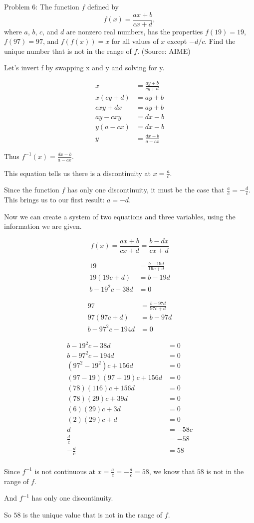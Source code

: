 Problem 6: The function $f$ defined by $$f(x) = \frac{ax + b}{cx + d}, $$where $a$, $b$, $c$, and $d$ are nonzero real numbers, has the properties $f(19) = 19$, $f(97) = 97$, and $f(f(x)) = x$ for all values of $x$ except $-d/c$. Find the unique number that is not in the range of $f$. (Source: AIME)

Let's invert f by swapping x and y and solving for y.

\begin{align*}
x &= \frac{ay + b}{cy + d} \\
x(cy + d) &= ay + b \\
cxy + dx &= ay + b \\
ay - cxy &= dx - b \\
y(a - cx) &= dx - b \\
y &= \frac{dx - b}{a - cx}
\end{align*}

Thus $f^{-1}(x) = \frac{dx - b}{a - cx}$.

This equation tells us there is a discontinuity at $x = \frac{a}{c}$.

Since the function $f$ has only one discontinuity, it must be the case that $\frac{a}{c} = - \frac{d}{c}$. This brings us to our first result: $a = -d$.

Now we can create a system of two equations and three variables, using the information we are given.

$$ f(x) = \frac{ax + b}{cx + d} = \frac{b - dx}{cx + d} $$

\begin{align*}
19 &= \frac{b - 19d}{19c + d} \\
19(19c + d) &= b - 19d \\
b - 19^2c - 38d &= 0
\end{align*}

\begin{align*}
97 &= \frac{b - 97d}{97c + d} \\
97(97c + d) &= b - 97d \\
b - 97^2c - 194d &= 0
\end{align*}

\begin{align*}
b - 19^2c - 38d &= 0 \\
b - 97^2c - 194d &= 0 \\
(97^2 - 19^2)c + 156d &= 0 \\
(97 - 19)(97 + 19)c + 156d &= 0 \\
(78)(116)c + 156d &= 0 \\
(78)(29)c + 39d &= 0 \\
(6)(29)c + 3d &= 0 \\
(2)(29)c + d &= 0 \\
d &= -58c \\
\frac{d}{c} &= -58 \\
-\frac{d}{c} &= 58 \\
\end{align*}

Since $f^{-1}$ is not continuous at $x = \frac{a}{c} = -\frac{d}{c} = 58$, we know that $58$ is not in the range of $f$.

And $f^{-1}$ has only one discontinuity.

So $\boxed{58}$ is the unique value that is not in the range of $f$.
